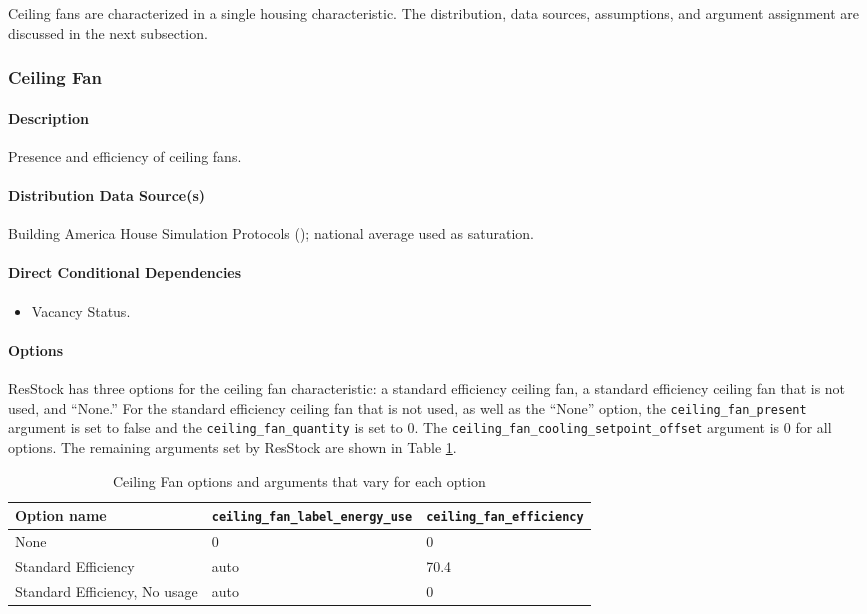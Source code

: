 Ceiling fans are characterized in a single housing characteristic. The distribution, data sources, assumptions, and argument assignment are discussed in the next subsection.

\subsubsection{Ceiling Fan}
\paragraph{Description}
Presence and efficiency of ceiling fans.

\paragraph{Distribution Data Source(s)}
Building America House Simulation Protocols (\cite{Wilson2014}); national average used as saturation.

\paragraph{Direct Conditional Dependencies}
\begin{itemize}
    \item Vacancy Status.
\end{itemize}

\paragraph{Options}
ResStock has three options for the ceiling fan characteristic: a standard efficiency ceiling fan, a standard efficiency ceiling fan that is not used, and ``None.'' For the standard efficiency ceiling fan that is not used, as well as the ``None'' option, the \texttt{ceiling\_fan\_present} argument is set to false and the \texttt{ceiling\_fan\_quantity} is set to 0. The \texttt{ceiling\_fan\_cooling\_setpoint\_offset} argument is 0 for all options. The remaining arguments set by ResStock are shown in Table \ref{table:opt_def_ceiling_fans}.

\begin{longtable}[]{ |p{5cm}|p{4cm}|p{4cm}| }
\caption{Ceiling Fan options and arguments that vary for each option} \label{table:opt_def_ceiling_fans}\\
\toprule\noalign{}
Option name &
\texttt{ceiling\_fan\_label\_energy\_use} &
\texttt{ceiling\_fan\_efficiency} \\
\midrule\noalign{}
\endhead
\bottomrule\noalign{}
\endlastfoot
None & 0 & 0 \\
Standard Efficiency & auto & 70.4 \\
Standard Efficiency, No usage & auto & 0 \\
\end{longtable}

